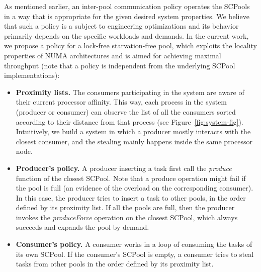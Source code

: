 As mentioned earlier, an inter-pool communication policy operates the SCPools in a way that is appropriate for the given desired system properties. 
We believe that such a policy is a subject to engineering optimizations and its behavior primarily depends on the specific workloads and demands.
In the current work, we propose a policy for a lock-free starvation-free pool, which exploits the locality properties of NUMA architectures and is aimed for achieving maximal throughput (note that a policy is independent from the underlying SCPool implementations):
\begin{itemize}
	\item {\bf Proximity lists.} The consumers participating in the system are aware of their current processor affinity. This way, each process in the system (producer or consumer) can observe the list of all the consumers sorted according to their distance from that process (see Figure~\ref{fig:system-fig}). Intuitively, we build a system in which a producer mostly interacts with the closest consumer, and the stealing mainly happens inside the same processor node. 
	\item {\bf Producer's policy.} A producer inserting a task first call the \emph{produce} function of the closest SCPool. Note that a produce operation might fail if the pool is full (an evidence of the overload on the corresponding consumer).  In this case, the producer tries to insert a task to other pools, in the order defined by its proximity list. If all the pools are full, then the producer invokes the \emph{produceForce} operation on the closest SCPool, which always succeeds and expands the pool by demand. 
	\item {\bf Consumer's policy.} A consumer works in a loop of consuming the tasks of its own SCPool. If the consumer's SCPool is empty, a consumer tries to steal tasks from other pools in the order defined by its proximity list. 
\end{itemize}





